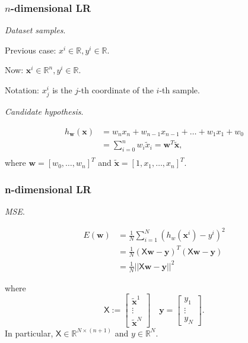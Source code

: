 \documentclass{beamer}
\begin{document}
	\begin{frame}
		\frametitle{$n$-dimensional LR}
		\textsl{Dataset samples}.
		
		Previous case: $x^i \in \mathbb{R}, y^i \in \mathbb{R}$.
		
		\vspace{1 mm}
		
		Now:  $\bm{x}^i \in \mathbb{R}^n, y^i \in \mathbb{R}$.
		
		Notation: $x^i_j$ is the $j$-th coordinate of the $i$-th sample.
		
		\vspace{5 mm}
		
		\textsl{Candidate hypothesis}.
		
		\begin{align*}
			h_{\bm{w}}(\bm{x}) &= w_{n}x_n + w_{n-1}x_{n-1} + \dots + w_1 x_1 + w_0\\
			&= \sum_{i=0}^n w_i \tilde{x}_i = \bm{w}^T \tilde{\bm{x}},\\
		\end{align*}
		where $\bm{w} = [w_0, \dots, w_n]^T$ and $\tilde{\bm{x}} = [1, x_1, \dots, x_n]^T$.
		
	\end{frame}

	\begin{frame}
		\frametitle{n-dimensional LR}
		\textsl{MSE}.
		
		\begin{align*}
			E(\bm{w}) &= \frac{1}{N} \sum_{i=1}^{N} (h_w(\bm{x}^i) - y^i)^2\\
			&= \frac{1}{N} (\mathsf{X} \bm{w} - \bm{y})^T (\mathsf{X}\bm{w} - \bm{y})\\
			&= \frac{1}{N} ||\mathsf{X}\bm{w} - \bm{y}||^2
		\end{align*}
		
		where
		\begin{equation*}
			\mathsf{X} := \begin{bmatrix}
				\tilde{\bm{x}}^1\\
				\vdots\\
				\tilde{\bm{x}}^N 
			\end{bmatrix} \quad \bm{y} = \begin{bmatrix}
			y_1 \\
			\vdots\\
			y_N
		\end{bmatrix}.
		\end{equation*}
	In particular, $\mathsf{X} \in \mathbb{R}^{N \times (n+1)}$ and $y \in \mathbb{R}^N$.
	\end{frame}
\end{document}
